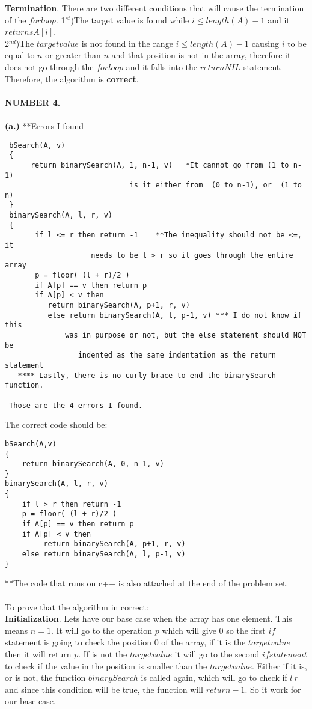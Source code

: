 \documentclass[10pt]{article}
\begin{document}
\textbf{Termination}. There are two different conditions that will cause the termination of the $for loop$. 1$^{st}$)The target value is found while $i \leq length(A)-1$ and it $returns A[i]$. \\ 2$^{nd}$)The $target value$ is not found in the range $i \leq length(A)-1$ causing $i$ to be equal to $n$ or greater than $n$ and that position is not in the array, therefore it does not go through the $for loop$ and it falls into the $return NIL$ statement. Therefore, the algorithm is \textbf{correct}.\\\\
\textbf{NUMBER 4.} \\\\
\textbf{(a.)} 
**Errors I found 
\begin{verbatim}
 bSearch(A, v) 
 {
      return binarySearch(A, 1, n-1, v)   *It cannot go from (1 to n-1) 
                             is it either from  (0 to n-1), or  (1 to n)
 }
 binarySearch(A, l, r, v) 
 {
       if l <= r then return -1    **The inequality should not be <=, it 
                    needs to be l > r so it goes through the entire array
       p = floor( (l + r)/2 )
       if A[p] == v then return p
       if A[p] < v then
          return binarySearch(A, p+1, r, v)
          else return binarySearch(A, l, p-1, v) *** I do not know if this 
              was in purpose or not, but the else statement should NOT be
                 indented as the same indentation as the return statement
   **** Lastly, there is no curly brace to end the binarySearch function. 

 Those are the 4 errors I found. 
\end{verbatim}
The correct code should be:
\begin{verbatim}
bSearch(A,v) 
{
    return binarySearch(A, 0, n-1, v)
}
binarySearch(A, l, r, v)
{
    if l > r then return -1
    p = floor( (l + r)/2 )
    if A[p] == v then return p
    if A[p] < v then
         return binarySearch(A, p+1, r, v)
    else return binarySearch(A, l, p-1, v)
}
\end{verbatim}
**The code that runs on c++ is also attached at the end of the problem set.\\\\
To prove that the algorithm in correct:\\
\textbf{Initialization}. Lets have our base case when the array has one element. This means $n=1$. It will go to the operation $p$ which will give $0$ so the first $if$ statement is going to check the position $0$ of the array, if it is the $target value$ then it will return $p$. If is not the $target value$ it will go to the second $if statement$ to check if the value in the position is smaller than the $target value$. Either if it is, or is not, the function $binarySearch$ is called again, which will go to check if $l \> r$ and since this condition will be true, the function will $return -1$. So it work for our base case.\\
\end{document}
